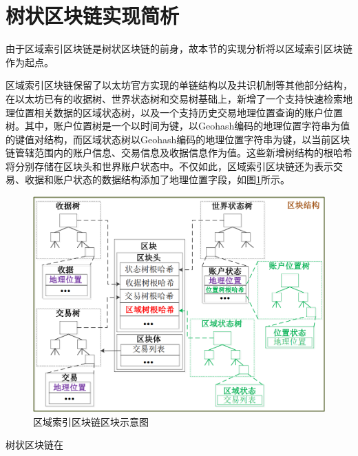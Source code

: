 \section{树状区块链实现简析}

由于区域索引区块链是树状区块链的前身，故本节的实现分析将以区域索引区块链作为起点。

区域索引区块链保留了以太坊官方实现的单链结构以及共识机制等其他部分结构，在以太坊已有的收据树、世界状态树和交易树基础上，新增了一个支持快速检索地理位置相关数据的区域状态树，以及一个支持历史交易地理位置查询的账户位置树。其中，账户位置树是一个以时间为键，以Geohash编码的地理位置字符串为值的键值对结构，而区域状态树以Geohash编码的地理位置字符串为键，以当前区块链管辖范围内的账户信息、交易信息及收据信息作为值。这些新增树结构的根哈希将分别存储在区块头和世界账户状态中。不仅如此，区域索引区块链还为表示交易、收据和账户状态的数据结构添加了地理位置字段，如图\ref{区域链区块示意图}所示。

\begin{figure}[htbp]
    \centering
    \includegraphics[width=\textwidth]{images/区域链区块示意图.png}
    \caption{区域索引区块链区块示意图}\label{区域链区块示意图} %
  \end{figure}

  树状区块链在%

